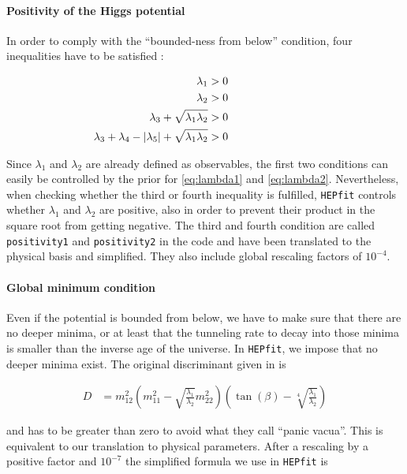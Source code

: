 \documentclass[aps,superscriptaddress,nofootinbib,floatfix,notitlepage]{revtex4-1}
\newcommand{\HEPfit}{\texttt{HEPfit}\xspace}
\begin{document}
\paragraph{Positivity of the Higgs potential}

In order to comply with the ``bounded-ness from below'' condition, four inequalities have to be satisfied \cite{Deshpande:1977rw}:

\begin{align}
 \lambda_1&>0 \hspace*{80pt}\nonumber\\
 \lambda_2&>0 \nonumber\\
 \lambda_3 + \sqrt{\lambda_1 \lambda_2} &>0 \nonumber\\
 \lambda_3 + \lambda_4 - |\lambda_5| + \sqrt{\lambda_1 \lambda_2}&>0 \nonumber
\end{align}

Since $\lambda_1$ and $\lambda_2$ are already defined as observables, the first two conditions can easily be controlled by the prior for \eqref{eq:lambda1} and \eqref{eq:lambda2}. Nevertheless, when checking whether the third or fourth inequality is fulfilled, \HEPfit controls whether $\lambda_1$ and $\lambda_2$ are positive, also in order to prevent their product in the square root from getting negative. The third and fourth condition are called {\tt positivity1} and {\tt positivity2} in the code and have been translated to the physical basis and simplified. They also include global rescaling factors of $10^{-4}$.\\

\paragraph{Global minimum condition}

Even if the potential is bounded from below, we have to make sure that there are no deeper minima, or at least that the tunneling rate to decay into those minima is smaller than the inverse age of the universe. In \HEPfit, we impose that no deeper minima exist.
The original discriminant given in \cite{Barroso:2013awa} is

\begin{align}
 D&=m_{12}^2 \left( m_{11}^2 - \sqrt{\frac{\lambda_1}{\lambda_2}}m_{22}^2 \right) \left( \tan(\beta ) -\sqrt[4]{\frac{\lambda_1}{\lambda_2}}\right) \nonumber
\end{align}

and has to be greater than zero to avoid what they call ``panic vacua''. This is equivalent to our translation to physical parameters. After a rescaling by a positive factor and $10^{-7}$ the simplified formula we use in \HEPfit is
\end{document}
